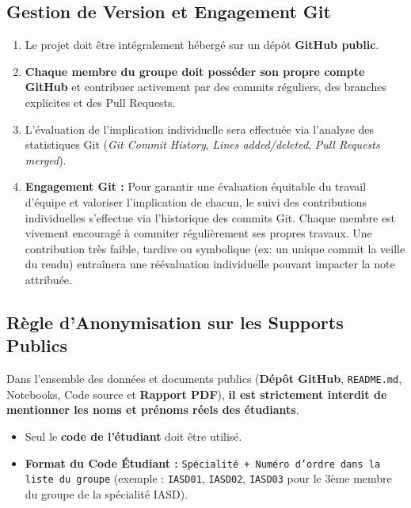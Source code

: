 \documentclass[11pt,a4paper]{article}
\begin{document}
\subsection{Gestion de Version et Engagement Git}
\begin{tcolorbox}[colback=sintefblue!10, colframe=sintefblue, title=\textbf{RECOMMANDATION \& ENGAGEMENT GIT (TRAÇABILITÉ INDIVIDUELLE)}, arc=2mm]
    \begin{enumerate}[leftmargin=*]
        \item Le projet doit être intégralement hébergé sur un dépôt \textbf{GitHub public}.
        \item \textbf{Chaque membre du groupe doit posséder son propre compte GitHub} et contribuer activement par des commits réguliers, des branches explicites et des Pull Requests.
        \item L'évaluation de l'implication individuelle sera effectuée via l'analyse des statistiques Git (\textit{Git Commit History}, \textit{Lines added/deleted}, \textit{Pull Requests merged}).
        \item \textbf{Engagement Git :} Pour garantir une évaluation équitable du travail d'équipe et valoriser l'implication de chacun, le suivi des contributions individuelles s'effectue via l'historique des commits Git. Chaque membre est vivement encouragé à commiter régulièrement ses propres travaux. Une contribution très faible, tardive ou symbolique (ex: un unique commit la veille du rendu) entraînera une réévaluation individuelle pouvant impacter la note attribuée.
    \end{enumerate}
\end{tcolorbox}

\subsection{Règle d'Anonymisation sur les Supports Publics}
\begin{tcolorbox}[colback=sintefgold!15, colframe=sintefgold!80!black, title=\textbf{CONFIDENTIALITÉ ET ANONYMAT SUR LES SUPPORTS PUBLIC}, arc=2mm]
    Dans l'ensemble des données et documents publics (\textbf{Dépôt GitHub}, \texttt{README.md}, Notebooks, Code source et \textbf{Rapport PDF}), \textbf{il est strictement interdit de mentionner les noms et prénoms réels des étudiants}.
    \begin{itemize}[leftmargin=*]
        \item Seul le \textbf{code de l'étudiant} doit être utilisé.
        \item \textbf{Format du Code Étudiant :} \texttt{Spécialité + Numéro d'ordre dans la liste du groupe} (exemple : \texttt{IASD01}, \texttt{IASD02}, \texttt{IASD03} pour le 3ème membre du groupe de la spécialité IASD).
    \end{itemize}
\end{tcolorbox}
\end{document}
